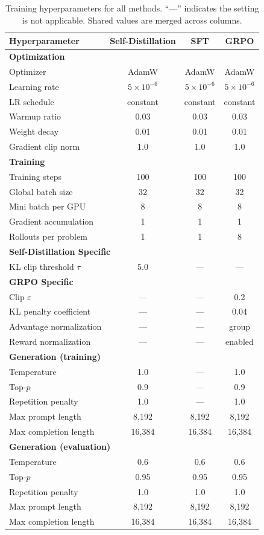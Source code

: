 \documentclass[11pt]{article}
\begin{document}
\begin{table}[p]
  \centering
  \small
  \renewcommand{\arraystretch}{1.25}
  \begin{tabular}{lccc}
  \toprule
  \textbf{Hyperparameter} & \textbf{Self-Distillation} & \textbf{SFT} & \textbf{GRPO} \\
  \midrule
  \multicolumn{4}{l}{\textbf{Optimization}} \\
  Optimizer & AdamW & AdamW & AdamW \\
  Learning rate & $5 \times 10^{-6}$ & $5 \times 10^{-6}$ & $5 \times 10^{-6}$ \\
  LR schedule & constant & constant & constant \\
  Warmup ratio & 0.03 & 0.03 & 0.03 \\
  Weight decay & 0.01 & 0.01 & 0.01 \\
  Gradient clip norm & 1.0 & 1.0 & 1.0 \\
  \midrule
  \multicolumn{4}{l}{\textbf{Training}} \\
  Training steps & 100 & 100 & 100 \\
  Global batch size & 32 & 32 & 32 \\
  Mini batch per GPU & 8 & 8 & 8 \\
  Gradient accumulation & 1 & 1 & 1 \\
  Rollouts per problem & 1 & 1 & 8 \\
  \midrule
  \multicolumn{4}{l}{\textbf{Self-Distillation Specific}} \\
  KL clip threshold $\tau$ & 5.0 & — & — \\
  \midrule
  \multicolumn{4}{l}{\textbf{GRPO Specific}} \\
  Clip $\varepsilon$ & — & — & 0.2 \\
  KL penalty coefficient & — & — & 0.04 \\
  Advantage normalization & — & — & group \\
  Reward normalization & — & — & enabled \\
  \midrule
  \multicolumn{4}{l}{\textbf{Generation (training)}} \\
  Temperature & 1.0 & — & 1.0 \\
  Top-$p$ & 0.9 & — & 0.9 \\
  Repetition penalty & 1.0 & — & 1.0 \\
  Max prompt length & 8,192 & 8,192 & 8,192 \\
  Max completion length & 16,384 & 16,384 & 16,384 \\
  \midrule
  \multicolumn{4}{l}{\textbf{Generation (evaluation)}} \\
  Temperature & 0.6 & 0.6 & 0.6 \\
  Top-$p$ & 0.95 & 0.95 & 0.95 \\
  Repetition penalty & 1.0 & 1.0 & 1.0 \\
  Max prompt length & 8,192 & 8,192 & 8,192 \\
  Max completion length & 16,384 & 16,384 & 16,384 \\
  \bottomrule
  \end{tabular}
  \caption{Training hyperparameters for all methods. ``---'' indicates the setting is not applicable. Shared values are merged across columns.}
  \label{tab:hyperparams}
  \end{table}
\end{document}
